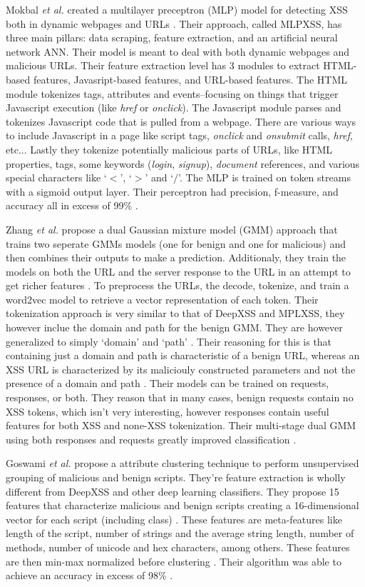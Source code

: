 Mokbal \textit{et al.} created a multilayer preceptron (MLP) model for detecting XSS both in dynamic webpages and URLs \cite{mokbal2019mlpxss}. Their approach, called MLPXSS, has three main pillars: data scraping, feature extraction, and an artificial neural network ANN. Their model is meant to deal with both dynamic webpages and malicious URLs. Their feature extraction level has 3 modules to extract HTML-based features, Javasript-based features, and URL-based features. The HTML module tokenizes tags, attributes and events--focusing on things that trigger Javascript execution (like \textit{href} or \textit{onclick}). The Javascript module parses and tokenizes Javascript code that is pulled from a webpage. There are various ways to include Javascript in a page like script tags, \textit{onclick} and \textit{onsubmit} calls, \textit{href}, etc... Lastly they tokenize potentially malicious parts of URLs, like HTML properties, tags, some keywords (\textit{login}, \textit{signup}), \textit{document} references, and various special characters like `$<$', `$>$' and `$/$'. The MLP is trained on token streams with a sigmoid output layer. Their perceptron had precision, f-measure, and accuracy all in excess of 99\% \cite{mokbal2019mlpxss}.

Zhang \textit{et al.} propose a dual Gaussian mixture model (GMM) approach that trains two seperate GMMs models (one for benign and one for malicious) and then combines their outputs to make a prediction. Additionaly, they train the models on both the URL and the server response to the URL in an attempt to get richer features \cite{zhang2019cross}. To preprocess the URLs, the decode, tokenize, and train a word2vec model to retrieve a vector representation of each token. Their tokenization approach is very similar to that of DeepXSS and MPLXSS, they however inclue the domain and path for the benign GMM. They are however generalized to simply `domain' and `path' \cite{zhang2019cross}. Their reasoning for this is that containing just a domain and path is characteristic of a benign URL, whereas an XSS URL is characterized by its maliciouly constructed parameters and not the presence of a domain and path \cite{zhang2019cross}. Their models can be trained on requests, responses, or both. They reason that in many cases, benign requests contain no XSS tokens, which isn't very interesting, however responses contain useful features for both XSS and none-XSS tokenization. Their multi-stage dual GMM using both responses and requests greatly improved classification \cite{zhang2019cross}.

Goswami \textit{et al.} propose a attribute clustering technique to perform unsupervised grouping of malicious and benign scripts. They're feature extraction is wholly different from DeepXSS and other deep learning classifiers. They propose 15 features that characterize malicious and benign scripts creating a 16-dimensional vector for each script (including class) \cite{goswami2017unsupervised}. These features are meta-features like length of the script, number of strings and the average string length, number of methods, number of unicode and hex characters, among others. These features are then min-max normalized before clustering \cite{goswami2017unsupervised}. Their algorithm was able to achieve an accuracy in excess of 98\% \cite{goswami2017unsupervised}.  